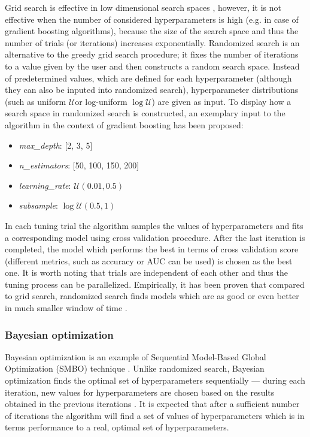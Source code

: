 \documentclass[magisterska, english]{pwr_wmat_praca_dyplomowa}
\theoremstyle{plain}
\numberwithin{theorem}{chapter}
\theoremstyle{definition}
\numberwithin{theorem}{chapter}
\newcommand{\U}{$\mathcal{U}$}
\newcommand{\logU}{$\log\mathcal{U}$}
\begin{document}
Grid search is effective in low dimensional search spaces \cite{randomized}, however, it is not effective when the number of considered hyperparameters is high (e.g. in case of gradient boosting algorithms), because the size of the search space and thus the number of trials (or iterations) increases exponentially. Randomized search is an alternative to the greedy grid search procedure; it fixes the number of iterations to a value given by the user and then constructs a random search space. Instead of predetermined values, which are defined for each hyperparameter (although they can also be inputed into randomized search), hyperparameter distributions (such as uniform \U or log-uniform \logU) are given as input. To display how a search space in randomized search is constructed, an exemplary input to the algorithm in the context of gradient boosting has been proposed:
\begin{itemize}
    \item\emph{max\_depth}: [2, 3, 5]
    \item\emph{n\_estimators}: [50, 100, 150, 200]
    \item\emph{learning\_rate}: $\mathcal{U}(0.01, 0.5)$
    \item\emph{subsample}: $\log\mathcal{U}(0.5, 1)$
\end{itemize}
In each tuning trial the algorithm samples the values of hyperparameters and fits a corresponding model using cross validation procedure. After the last iteration is completed, the model which performs the best in terms of cross validation score (different metrics, such as accuracy or AUC can be used) is chosen as the best one. It is worth noting that trials are independent of each other and thus the tuning process can be parallelized. 
Empirically, it has been proven that compared to grid search, randomized search finds models which are as good or even better in much smaller window of time \cite{randomized}. 

\subsubsection{Bayesian optimization}
Bayesian optimization is an example of Sequential Model-Based Global Optimization (SMBO) technique \cite{tpe}. Unlike randomized search, Bayesian optimization finds the optimal set of hyperparameters sequentially --- during each iteration, new values for hyperparameters are chosen based on the results obtained in the previous iterations \cite{tpe}. It is expected that after a sufficient number of iterations the algorithm will find a set of values of hyperparameters which is in terms performance to a real, optimal set of hyperparameters.
\end{document}
